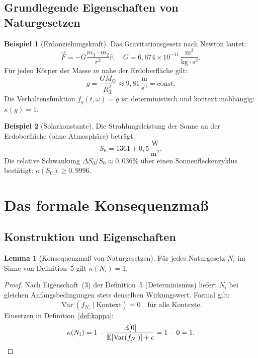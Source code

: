 ﻿\documentclass[a4paper,12pt]{article}
\DeclareMathOperator{\Var}{Var}
\theoremstyle{definition}
\newtheorem{beispiel}{Beispiel}
\newtheorem{lemma}{Lemma}
\begin{document}
\subsection{Grundlegende Eigenschaften von Naturgesetzen}

\begin{beispiel}[Erdanziehungskraft]
Das Gravitationsgesetz nach Newton lautet:
\[
\vec{F} = -G \frac{m_1 \cdot m_2}{r^2} \hat{r}, \quad G = 6{,}674 \times 10^{-11}\, \frac{\text{m}^3}{\text{kg} \cdot \text{s}^2}.
\]
Für jeden Körper der Masse $m$ nahe der Erdoberfläche gilt:
\[
g = \frac{GM_{\oplus}}{R_{\oplus}^2} \approx 9{,}81\, \frac{\text{m}}{\text{s}^2} = \text{const}.
\]
Die Verhaltensfunktion $f_g(t, \omega) = g$ ist deterministisch und kontextunabhängig: $\kappa(g) = 1$.
\end{beispiel}

\begin{beispiel}[Solarkonstante]
Die Strahlungsleistung der Sonne an der Erdoberfläche (ohne Atmosphäre) beträgt:
\[
S_0 = 1361 \pm 0{,}5\, \frac{\text{W}}{\text{m}^2}.
\]
Die relative Schwankung $\Delta S_0 / S_0 \approx 0{,}036\%$ über einen Sonnenfleckenzyklus bestätigt: $\kappa(S_0) \geq 0{,}9996$.
\end{beispiel}

\section{Das formale Konsequenzmaß}

\subsection{Konstruktion und Eigenschaften}

\begin{lemma}[Konsequenzmaß von Naturgesetzen]
\label{lem:nl_kappa}
Für jedes Naturgesetz $N_i$ im Sinne von Definition~5 gilt $\kappa(N_i) = 1$.
\end{lemma}

\begin{proof}
Nach Eigenschaft~(3) der Definition~5 (Determinismus) liefert $N_i$ bei gleichen Anfangsbedingungen stets denselben Wirkungswert. Formal gilt:
\[
\Var(f_{N_i} \mid \text{Kontext}) = 0 \quad \text{für alle Kontexte.}
\]
Einsetzen in Definition~\ref{def:kappa}:
\[
\kappa(N_i) = 1 - \frac{\mathbb{E}[0]}{\mathbb{E}[\Var(f_{N_i})] + \epsilon} = 1 - 0 = 1. \qedhere
\]
\end{proof}
\end{document}
